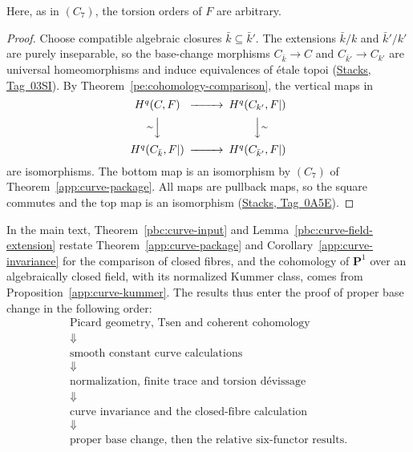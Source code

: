 \documentclass[11pt,a4paper]{article}
\numberwithin{equation}{section}
\theoremstyle{definition}
\theoremstyle{remark}
\newcommand{\stacks}[1]{\href{https://stacks.math.columbia.edu/tag/#1}{\textnormal{Stacks, Tag~#1}}}
\newcommand{\PP}{\mathbf P}
\begin{document}
Here, as in $(C_7)$, the torsion orders of $F$ are arbitrary.

\begin{proof}
Choose compatible algebraic closures $\bar k\subseteq\bar k'$.  The
extensions $\bar k/k$ and $\bar k'/k'$ are purely inseparable, so the
base-change morphisms $C_{\bar k}\to C$ and $C_{\bar k'}\to C_{k'}$ are
universal homeomorphisms and induce equivalences of \'etale topoi
(\stacks{03SI}).  By Theorem~\ref{pe:cohomology-comparison}, the
vertical maps in
\[
 \begin{CD}
 H^q(C,F) @>>> H^q(C_{k'},F|)\\
 @V{\sim}VV @VV{\sim}V\\
 H^q(C_{\bar k},F|) @>>> H^q(C_{\bar k'},F|)
 \end{CD}
\]
are isomorphisms.  The bottom map is an isomorphism by $(C_7)$ of
Theorem~\ref{app:curve-package}.  All maps are pullback maps, so the
square commutes and the top map is an isomorphism (\stacks{0A5E}).
\end{proof}

In the main text, Theorem~\ref{pbc:curve-input} and
Lemma~\ref{pbc:curve-field-extension} restate
Theorem~\ref{app:curve-package} and Corollary~\ref{app:curve-invariance}
for the comparison of closed fibres, and the cohomology of $\PP^1$ over
an algebraically closed field, with its normalized Kummer class, comes
from Proposition~\ref{app:curve-kummer}.  The results thus enter the
proof of proper base change in the following order:
\[
 \begin{gathered}
 \text{Picard geometry, Tsen and coherent cohomology}\\
 \Downarrow\\
 \text{smooth constant curve calculations}\\
 \Downarrow\\
 \text{normalization, finite trace and torsion d\'evissage}\\
 \Downarrow\\
 \text{curve invariance and the closed-fibre calculation}\\
 \Downarrow\\
 \text{proper base change, then the relative six-functor results}.
 \end{gathered}
\]
\end{document}
